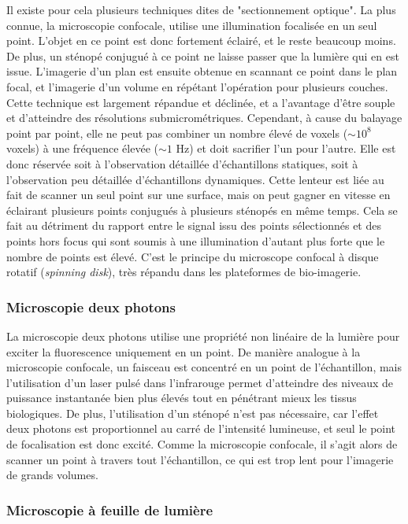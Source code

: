 Il existe pour cela plusieurs techniques dites de "sectionnement optique". La plus connue, la microscopie confocale, utilise une illumination focalisée en un seul point. L'objet en ce point est donc fortement éclairé, et le reste beaucoup moins. De plus, un sténopé conjugué à ce point ne laisse passer que la lumière qui en est issue. L'imagerie d'un plan est ensuite obtenue en scannant ce point dans le plan focal, et l'imagerie d'un volume en répétant l'opération pour plusieurs couches. Cette technique est largement répandue et déclinée, et a l'avantage d'être souple et d'atteindre des résolutions submicrométriques. Cependant, à cause du balayage point par point, elle ne peut pas combiner un nombre élevé de voxels ($\sim 10^8$ voxels) à une fréquence élevée ($\sim 1$ Hz) et doit sacrifier l'un pour l'autre. Elle est donc réservée soit à l'observation détaillée d'échantillons statiques, soit à l'observation peu détaillée d'échantillons dynamiques. Cette lenteur est liée au fait de scanner un seul point sur une surface, mais on peut gagner en vitesse en éclairant plusieurs points conjugués à plusieurs sténopés en même temps. Cela se fait au détriment du rapport entre le signal issu des points sélectionnés et des points hors focus qui sont soumis à une illumination d'autant plus forte que le nombre de points est élevé. C'est le principe du microscope confocal à disque rotatif (\emph{spinning disk}), très répandu dans les plateformes de bio-imagerie.

\subsubsection{Microscopie deux photons}

La microscopie deux photons utilise une propriété non linéaire de la lumière pour exciter la fluorescence uniquement en un point. De manière analogue à la microscopie confocale, un faisceau est concentré en un point de l'échantillon, mais l'utilisation d'un laser pulsé dans l'infrarouge permet d'atteindre des niveaux de puissance instantanée bien plus élevés tout en pénétrant mieux les tissus biologiques. De plus, l'utilisation d'un sténopé n'est pas nécessaire, car l'effet deux photons est proportionnel au carré de l'intensité lumineuse, et seul le point de focalisation est donc excité. Comme la microscopie confocale, il s'agit alors de scanner un point à travers tout l'échantillon, ce qui est trop lent pour l'imagerie de grands volumes.  

\subsubsection{Microscopie à feuille de lumière}

